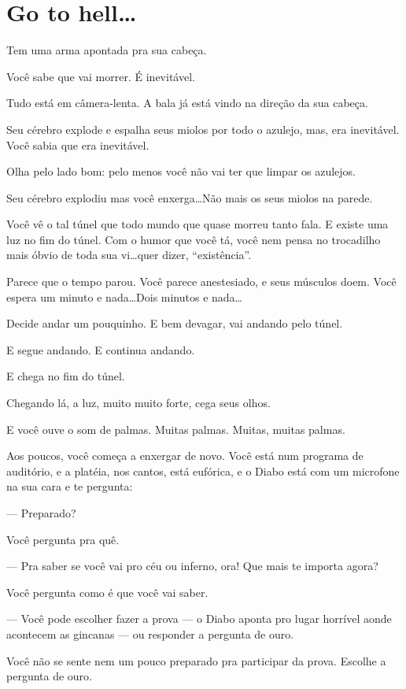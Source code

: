 \chapter{Go to hell\ldots}

Tem uma arma apontada pra sua cabeça.

Você sabe que vai morrer. É inevitável.

Tudo está em câmera-lenta. A bala já está vindo na direção da sua cabeça.

Seu cérebro explode e espalha seus miolos por todo o azulejo, mas, era inevitável. Você sabia que era inevitável.

Olha pelo lado bom: pelo menos você não vai ter que limpar os azulejos.

Seu cérebro explodiu mas você enxerga\ldots Não mais os seus miolos na parede.

Você vê o tal túnel que todo mundo que quase morreu tanto fala. E existe uma luz no fim do túnel. Com o humor que você tá, você nem pensa no trocadilho mais óbvio de toda sua vi\ldots quer dizer, ``existência''.

Parece que o tempo parou. Você parece anestesiado, e seus músculos doem. Você espera um minuto e nada\ldots Dois minutos e nada\ldots

Decide andar um pouquinho. E bem devagar, vai andando pelo túnel.

E segue andando. E continua andando.

E chega no fim do túnel.

Chegando lá, a luz, muito muito forte, cega seus olhos.

E você ouve o som de palmas. Muitas palmas. Muitas, muitas palmas.

Aos poucos, você começa a enxergar de novo. Você está num programa de auditório, e a platéia, nos cantos, está eufórica, e o Diabo está com um microfone na sua cara e te pergunta:

--- Preparado?

Você pergunta pra quê.

--- Pra saber se você vai pro céu ou inferno, ora! Que mais te importa agora?

Você pergunta como é que você vai saber.

--- Você pode escolher fazer a prova --- o Diabo aponta pro lugar horrível aonde acontecem as gincanas --- ou responder a pergunta de ouro.

Você não se sente nem um pouco preparado pra participar da prova. Escolhe a pergunta de ouro.

